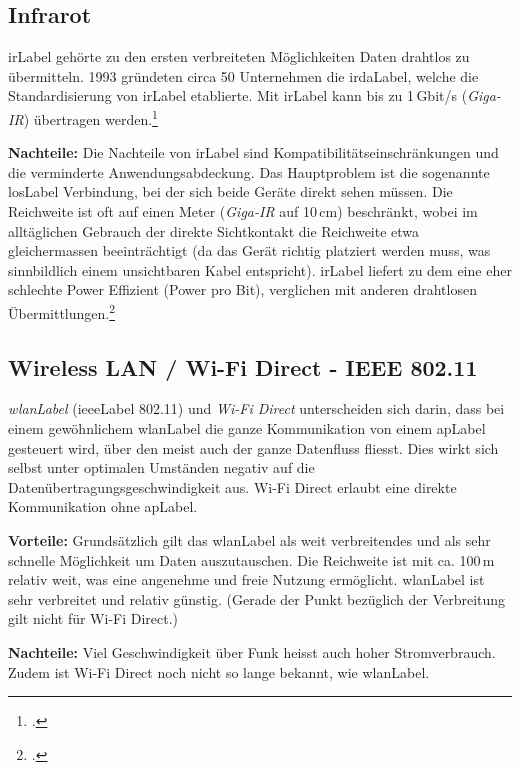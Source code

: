 \subsection{Infrarot}
\gls{irLabel} gehörte zu den ersten verbreiteten Möglichkeiten Daten drahtlos zu übermitteln.
1993 gründeten circa 50 Unternehmen die \gls{irdaLabel}, welche die Standardisierung von \gls{irLabel} etablierte.
Mit \gls{irLabel} kann bis zu 1\,Gbit/s (\textit{Giga-IR}) übertragen werden.\footcite{Infrared_Data_Association_Wikipedia_2015-05-22}

\textbf{Nachteile:}
Die Nachteile von \gls{irLabel} sind Kompatibilitätseinschränkungen und die verminderte Anwendungsabdeckung.
Das Hauptproblem ist die sogenannte \gls{losLabel} Verbindung, bei der sich beide Geräte direkt sehen müssen.
Die Reichweite ist oft auf einen Meter (\textit{Giga-IR} auf 10\,cm) beschränkt, wobei im alltäglichen Gebrauch der direkte Sichtkontakt die Reichweite etwa gleichermassen beeinträchtigt (da das Gerät richtig platziert werden muss, was sinnbildlich einem unsichtbaren Kabel entspricht).
\gls{irLabel} liefert zu dem eine eher schlechte Power Effizient (Power pro Bit), verglichen mit anderen drahtlosen Übermittlungen.\footcite{Comparing_Low_Power_Wireless_Technologies_DigiKey_2015-05-22}


\subsection{Wireless LAN / Wi-Fi Direct - IEEE 802.11}
\textit{\gls{wlanLabel}} (\gls{ieeeLabel} 802.11) und \textit{Wi-Fi Direct} unterscheiden sich darin, dass bei einem gewöhnlichem \gls{wlanLabel} die ganze Kommunikation von einem \gls{apLabel} gesteuert wird, über den meist auch der ganze Datenfluss fliesst. Dies wirkt sich selbst unter optimalen Umständen negativ auf die Datenübertragungsgeschwindigkeit aus.
Wi-Fi Direct erlaubt eine direkte Kommunikation ohne \gls{apLabel}.

\textbf{Vorteile:}
Grundsätzlich gilt das \gls{wlanLabel} als weit verbreitendes und als sehr schnelle Möglichkeit um Daten auszutauschen. Die Reichweite ist mit ca. 100\,m relativ weit, was eine angenehme und freie Nutzung ermöglicht.
\gls{wlanLabel} ist sehr verbreitet und relativ günstig. (Gerade der Punkt bezüglich der Verbreitung gilt nicht für Wi-Fi Direct.)

\textbf{Nachteile:}
Viel Geschwindigkeit über Funk heisst auch hoher Stromverbrauch. Zudem ist Wi-Fi Direct noch nicht so lange bekannt, wie \gls{wlanLabel}.

